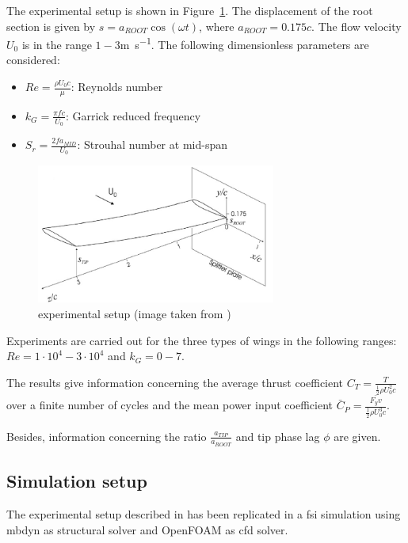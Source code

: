 The experimental setup is shown in Figure~\ref{fig:0012exp}. The displacement of the root section is given by $s = a_{ROOT} \cos(\omega t)$, where $a_{ROOT} = 0.175c$. The flow velocity $U_0$ is in the range $1-3$\si{m.s^{-1}}. The following dimensionless parameters are considered:

\begin{itemize}
	\item $Re = \frac{\rho U_0 c}{\mu}$: Reynolds number
	\item $k_G = \frac{\pi f c}{U_0}$: Garrick reduced frequency
	\item $S_r = \frac{2f a_{MID}}{U_0}$: Strouhal number at mid-span
\end{itemize}

\begin{figure}[htbp!]
	\centering
	\includegraphics[width=0.7\textwidth]{images/naca0012_exp}
	\caption{experimental setup (image taken from \cite{heathcote2008effect})}
	\label{fig:0012exp}
\end{figure}

Experiments are carried out for the three types of wings in the following ranges: $Re=1\cdot10^4-3\cdot10^4$ and $k_G=0-7$.

The results give information concerning the average thrust coefficient $C_T = \frac{T}{\frac{1}{2}\rho U_0^2c}$ over a finite number of cycles and the mean power input coefficient $\bar{C}_P = \frac{\bar{F_y v}}{\frac{1}{2}\rho U_0^3c}$.

Besides, information concerning the ratio $\frac{a_{TIP}}{a_{ROOT}}$ and tip phase lag $\phi$ are given.

\subsection{Simulation setup}

The experimental setup described in \cite{heathcote2008effect} has been replicated in a \acrshort{fsi} simulation using \acrshort{mbdyn} as structural solver and OpenFOAM as \acrshort{cfd} solver.

